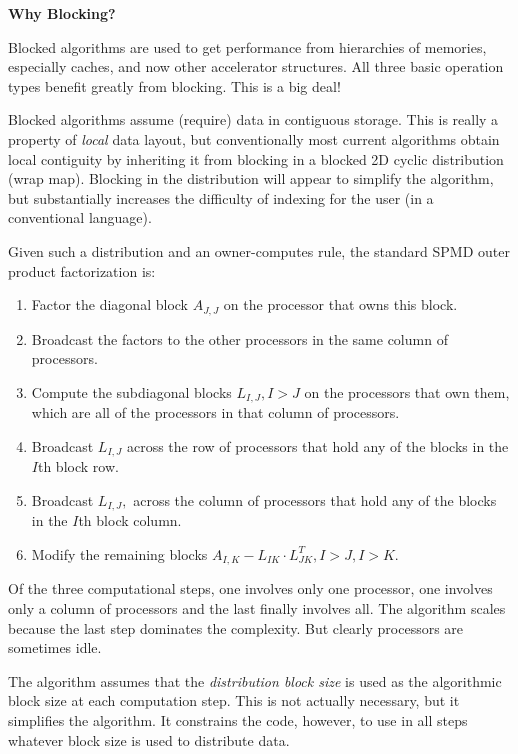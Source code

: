 \documentclass[10pt]{article}
\begin{document}
{\large \bf Why Blocking?}

Blocked algorithms are used to get performance from hierarchies of memories,
especially caches, and now other accelerator structures.  All three basic
operation types benefit greatly from blocking.  This is a big deal!

Blocked algorithms assume (require) data in contiguous storage.  This is really
a property of \emph{local} data layout, but conventionally most current
algorithms obtain local contiguity by inheriting it from blocking in a blocked
2D cyclic distribution (wrap map).  Blocking in the distribution will appear to
simplify the algorithm, but substantially increases the difficulty of indexing
for the user (in a conventional language).  

Given such a distribution and an owner-computes rule, the standard SPMD outer
product factorization is:

\begin{enumerate}
\item Factor the diagonal block $A_{J,J}$ on the processor that owns this block.
\item Broadcast the factors to the other processors in the same column of
  processors. 
\item Compute the subdiagonal blocks $L_{I,J}, I>J$ on the processors that own
  them, which are all of the processors in that column of processors.
\item Broadcast $L_{I,J}$ across the row of processors that hold any of the
  blocks in the $I$th block row.
\item Broadcast $L_{I,J},$ across the column of processors that hold any of the
  blocks in the $I$th block column.
\item Modify the remaining blocks $A_{I,K} - L_{IK} \cdot L_{JK}^T, I>J, I>K$.
\end{enumerate}

Of the three computational steps, one involves only one processor, one involves
only a column of processors and the last finally involves all.  The algorithm
scales because the last step dominates the complexity.  But clearly processors
are sometimes idle.

The algorithm assumes that the \emph {distribution block size} is used as the
algorithmic block size at each computation step.  This is not actually
necessary, but it simplifies the algorithm.  It constrains the code, however, to
use in all steps whatever block size is used to distribute data.
\end{document}
